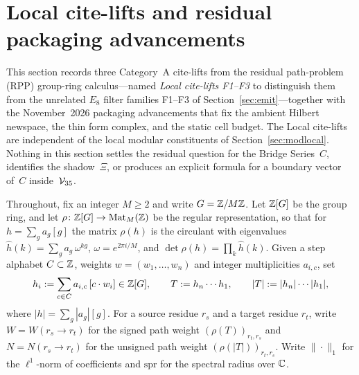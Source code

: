 \section{Local cite-lifts and residual packaging advancements}\label{sec:localadv}
This section records three Category~A cite-lifts from the residual path-problem (RPP) group-ring calculus---named \emph{Local cite-lifts F1--F3} to distinguish them from the unrelated $E_8$ filter families F1--F3 of Section~\ref{sec:emit}---together with the November~2026 packaging advancements that fix the ambient Hilbert newspace, the thin form complex, and the static cell budget. The Local cite-lifts are independent of the local modular constituents of Section~\ref{sec:modlocal}. Nothing in this section settles the residual question for the Bridge Series~$C$, identifies the shadow~$\Xi$, or produces an explicit formula for a boundary vector of~$C$ inside~$\mathcal V_{35}$.

Throughout, fix an integer $M\ge2$ and write $G=\mathbb{Z}/M\mathbb{Z}$. Let $\mathbb{Z}[G]$ be the group ring, and let $\rho\colon\mathbb{Z}[G]\to\mathrm{Mat}_M(\mathbb{Z})$ be the regular representation, so that for $h=\sum_g a_g[g]$ the matrix $\rho(h)$ is the circulant with eigenvalues $\hat h(k)=\sum_g a_g\,\omega^{kg}$, $\omega=e^{2\pi i/M}$, and $\det\rho(h)=\prod_k\hat h(k)$. Given a step alphabet $C\subset\mathbb{Z}$, weights $w=(w_1,\dots,w_n)$ and integer multiplicities $a_{i,c}$, set
\[
h_i:=\sum_{c\in C}a_{i,c}\,[c\cdot w_i]\in\mathbb{Z}[G],\qquad
T:=h_n\cdots h_1,\qquad
|T|:=|h_n|\cdots|h_1|,
\]
where $|h|=\sum_g|a_g|[g]$. For a source residue $r_s$ and a target residue $r_t$, write $W=W(r_s\to r_t)$ for the signed path weight $(\rho(T))_{r_t,r_s}$ and $N=N(r_s\to r_t)$ for the unsigned path weight $(\rho(|T|))_{r_t,r_s}$. Write $\|\cdot\|_1$ for the $\ell^1$-norm of coefficients and $\mathrm{spr}$ for the spectral radius over $\mathbb{C}$.


